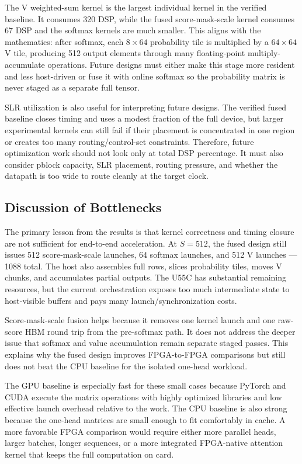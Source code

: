 \documentclass[conference]{IMSTemplate}
\begin{document}
The V weighted-sum kernel is the largest individual kernel in the verified
baseline. It consumes 320 DSP, while the fused score-mask-scale kernel consumes
67 DSP and the softmax kernels are much smaller. This aligns with the
mathematics: after softmax, each \(8\times64\) probability tile is multiplied
by a \(64\times64\) V tile, producing 512 output elements through many
floating-point multiply-accumulate operations. Future designs must either make
this stage more resident and less host-driven or fuse it with online softmax so
the probability matrix is never staged as a separate full tensor.

SLR utilization is also useful for interpreting future designs. The verified
fused baseline closes timing and uses a modest fraction of the full device, but
larger experimental kernels can still fail if their placement is concentrated
in one region or creates too many routing/control-set constraints. Therefore,
future optimization work should not look only at total DSP percentage. It must
also consider pblock capacity, SLR placement, routing pressure, and whether the
datapath is too wide to route cleanly at the target clock.

\subsection{Discussion of Bottlenecks}

The primary lesson from the results is that kernel correctness and timing
closure are not sufficient for end-to-end acceleration. At \(S=512\), the fused design still issues 512 score-mask-scale launches,
64 softmax launches, and 512 V launches --- 1088 total.
The host also assembles full rows, slices probability tiles, moves V chunks,
and accumulates partial outputs. The U55C has substantial remaining resources,
but the current orchestration exposes too much intermediate state to
host-visible buffers and pays many launch/synchronization costs.

Score-mask-scale fusion helps because it removes one kernel launch and one
raw-score HBM round trip from the pre-softmax path. It does not address the deeper issue that
softmax and value accumulation remain separate staged passes. This explains why
the fused design improves FPGA-to-FPGA comparisons but still does not beat the
CPU baseline for the isolated one-head workload.

The GPU baseline is especially fast for these small cases because PyTorch and
CUDA execute the matrix operations with highly optimized libraries and low
effective launch overhead relative to the work. The CPU baseline is also strong
because the one-head matrices are small enough to fit comfortably in cache. A
more favorable FPGA comparison would require either more parallel heads, larger
batches, longer sequences, or a more integrated FPGA-native attention kernel
that keeps the full computation on card.
\end{document}

